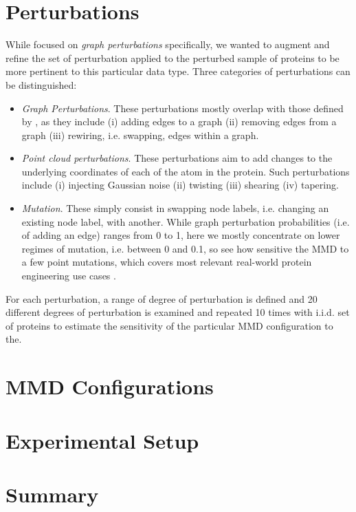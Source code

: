 \section{Perturbations}

While \cite{o2021evaluation} focused on \emph{graph perturbations} specifically,
we wanted to augment and refine the set of perturbation applied to the perturbed
sample of proteins to be more pertinent to this particular data type. Three categories of
perturbations can be distinguished:
\begin{itemize}
\item \emph{Graph Perturbations}. These perturbations mostly overlap with those defined by
  \cite{o2021evaluation}, as they include (i) adding edges to a graph (ii)
  removing edges from a graph (iii) rewiring, i.e. swapping, edges within a
  graph.
\item \emph{Point cloud perturbations}. These perturbations aim to add changes
  to the underlying coordinates of each of the atom in the protein. Such
  perturbations include (i) injecting Gaussian noise (ii) twisting (iii)
  shearing (iv) tapering.
\item \emph{Mutation}. These simply consist in swapping node labels, i.e.
  changing an existing node label, with another. While graph perturbation
  probabilities (i.e. of adding an edge) ranges from 0 to 1, here we mostly
  concentrate on lower regimes of mutation, i.e. between 0 and 0.1, so see how
  sensitive the MMD to a few point mutations, which covers most relevant
  real-world protein engineering use cases \cite{poluri2016protein}.
\end{itemize}

For each perturbation, a range of degree of perturbation is defined and 20
different degrees of perturbation is examined and repeated 10 times with i.i.d. set of
proteins to estimate the sensitivity of the particular MMD configuration to the.

\section{MMD Configurations}

\section{Experimental Setup}

\section{Summary}
